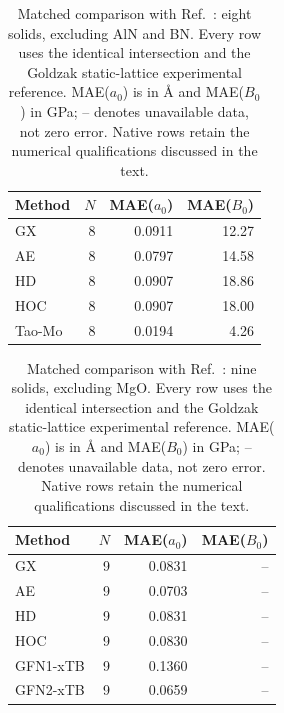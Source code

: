 \begin{table}[t]
\centering
\small
\caption{Matched comparison with Ref.~: eight solids, excluding AlN and BN. Every row uses the identical intersection and the Goldzak static-lattice experimental reference. MAE($a_0$) is in \AA{} and MAE($B_0$) in GPa; -- denotes unavailable data, not zero error. Native rows retain the numerical qualifications discussed in the text.}
\label{tab:literature-Mo2017}
\begin{tabular}{lrrr}
\toprule
Method & $N$ & MAE($a_0$) & MAE($B_0$) \\
\midrule
GX & 8 & 0.0911 & 12.27 \\
AE & 8 & 0.0797 & 14.58 \\
HD & 8 & 0.0907 & 18.86 \\
HOC & 8 & 0.0907 & 18.00 \\
Tao-Mo & 8 & 0.0194 & 4.26 \\
\bottomrule
\end{tabular}
\end{table}

\begin{table}[t]
\centering
\small
\caption{Matched comparison with Ref.~: nine solids, excluding MgO. Every row uses the identical intersection and the Goldzak static-lattice experimental reference. MAE($a_0$) is in \AA{} and MAE($B_0$) in GPa; -- denotes unavailable data, not zero error. Native rows retain the numerical qualifications discussed in the text.}
\label{tab:literature-PeriodicGFN2Manuscript}
\begin{tabular}{lrrr}
\toprule
Method & $N$ & MAE($a_0$) & MAE($B_0$) \\
\midrule
GX & 9 & 0.0831 & -- \\
AE & 9 & 0.0703 & -- \\
HD & 9 & 0.0831 & -- \\
HOC & 9 & 0.0830 & -- \\
GFN1-xTB & 9 & 0.1360 & -- \\
GFN2-xTB & 9 & 0.0659 & -- \\
\bottomrule
\end{tabular}
\end{table}

